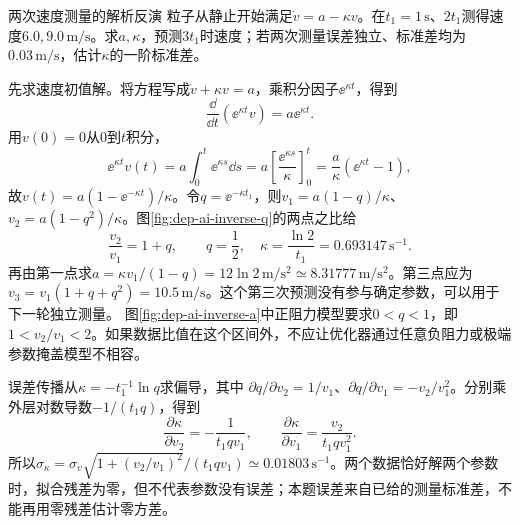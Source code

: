 \begin{example}两次速度测量的解析反演
粒子从静止开始满足$\dot v=a-\kappa v$。在$t_1=1\,\mathrm s$、$2t_1$测得速度$6.0,9.0\,\mathrm{m/s}$。求$a,\kappa$，预测$3t_1$时速度；若两次测量误差独立、标准差均为$0.03\,\mathrm{m/s}$，估计$\kappa$的一阶标准差。
\end{example}
\begin{solution}
先求速度初值解。将方程写成$\dot v+\kappa v=a$，乘积分因子$\ee^{\kappa t}$，得到
\[\frac{\dd}{\dd t}(\ee^{\kappa t}v)=a\ee^{\kappa t}.\]
用$v(0)=0$从$0$到$t$积分，
\[\ee^{\kappa t}v(t)=a\int_0^t\ee^{\kappa s}\dd s
=a\left[\frac{\ee^{\kappa s}}{\kappa}\right]_0^t
=\frac a\kappa(\ee^{\kappa t}-1),\]
故$v(t)=a(1-\ee^{-\kappa t})/\kappa$。令$q=\ee^{-\kappa t_1}$，则$v_1=a(1-q)/\kappa$、$v_2=a(1-q^2)/\kappa$。图\ref{fig:dep-ai-inverse-q}的两点之比给
\[
 \frac{v_2}{v_1}=1+q,\qquad
 q=\frac12,\quad \kappa=\frac{\ln2}{t_1}=0.693147\,\mathrm{s^{-1}}.
\]
再由第一点求$a=\kappa v_1/(1-q)=12\ln2\,\mathrm{m/s^2}\simeq8.31777\,\mathrm{m/s^2}$。第三点应为$v_3=v_1(1+q+q^2)=10.5\,\mathrm{m/s}$。这个第三次预测没有参与确定参数，可以用于下一轮独立测量。
图\ref{fig:dep-ai-inverse-a}中正阻力模型要求$0<q<1$，即$1<v_2/v_1<2$。如果数据比值在这个区间外，不应让优化器通过任意负阻力或极端参数掩盖模型不相容。

误差传播从$\kappa=-t_1^{-1}\ln q$求偏导，其中
$\partial q/\partial v_2=1/v_1$、$\partial q/\partial v_1=-v_2/v_1^2$。分别乘外层对数导数$-1/(t_1q)$，得到
\[
 \frac{\partial\kappa}{\partial v_2}=-\frac1{t_1qv_1},\qquad
 \frac{\partial\kappa}{\partial v_1}=\frac{v_2}{t_1qv_1^2}.
\]
所以$\sigma_\kappa=\sigma_v\sqrt{1+(v_2/v_1)^2}/(t_1qv_1)\simeq0.01803\,\mathrm{s^{-1}}$。两个数据恰好解两个参数时，拟合残差为零，但不代表参数没有误差；本题误差来自已给的测量标准差，不能再用零残差估计零方差。
\end{solution}

